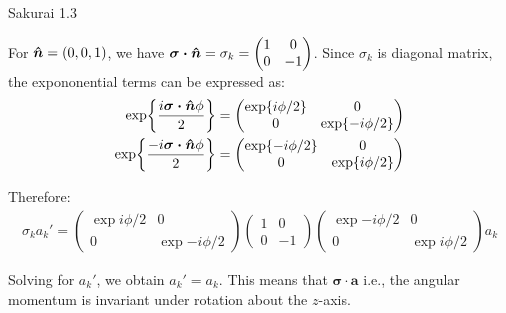 \documentclass{article}
\begin{document}
\begin{section}{Sakurai 1.3}
\begin{tcolorbox}[breakable]
		For $\boldsymbol{\hat{n}} = (0,0,1)$, we have $\boldsymbol{\sigma \cdot \hat{n}} = \sigma_k = \begin{pmatrix}1 & 0 \\ 0 & -1 \end{pmatrix}$.
		Since $\sigma_k$ is diagonal matrix, the expononential terms can be expressed as:
		\begin{align*}
			\exp{{\frac{i \boldsymbol{\sigma \cdot \hat{n}}\phi}{2}}}  & =
			\begin{pmatrix}
				\exp{i \phi / 2} & 0                 \\
				0                & \exp{-i \phi / 2}
			\end{pmatrix}   \\
			\exp{{\frac{-i \boldsymbol{\sigma \cdot \hat{n}}\phi}{2}}} & =
			\begin{pmatrix}
				\exp{-i \phi / 2} & 0                \\
				0                 & \exp{i \phi / 2}
			\end{pmatrix}   \\
		\end{align*}

		Therefore:
		\begin{align*}
			\sigma_k a_k' =
			\begin{pmatrix}
				\exp{i \phi / 2} & 0                 \\
				0                & \exp{-i \phi / 2}
			\end{pmatrix}
			\begin{pmatrix}1 & 0 \\ 0 & -1 \end{pmatrix}
			\begin{pmatrix}
				\exp{-i \phi / 2} & 0                \\
				0                 & \exp{i \phi / 2}
			\end{pmatrix}
			a_k
		\end{align*}

		Solving for $a_k'$, we obtain $a_k' = a_k$. This means that $\boldsymbol{\sigma \cdot a}$  i.e., the angular momentum is invariant under rotation about the $z$-axis.
	\end{tcolorbox}
\end{section}
\end{document}
